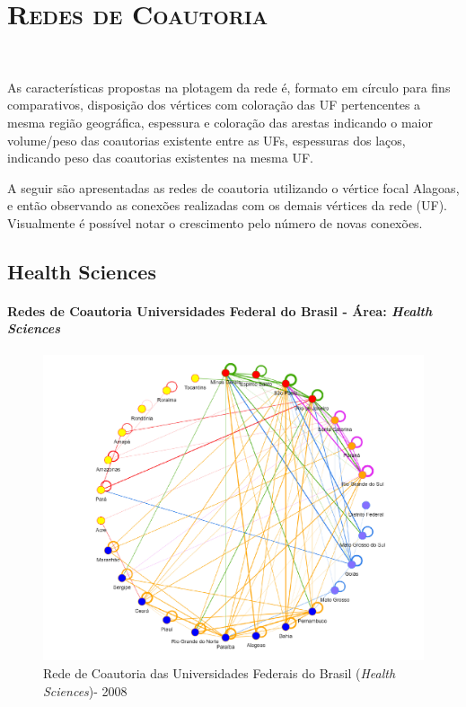 \chapter{\textsc{Redes de Coautoria}}~\label{redes}

As características propostas na plotagem da rede é, formato em círculo para fins comparativos, disposição dos vértices com coloração das UF pertencentes a mesma região geográfica, espessura e coloração das arestas indicando o maior volume/peso das coautorias existente entre as UFs, espessuras dos laços, indicando peso das coautorias existentes na mesma UF.

A seguir são apresentadas as redes de coautoria utilizando o vértice focal Alagoas, e então observando as conexões realizadas com os demais vértices da rede (UF). Visualmente é possível notar o crescimento pelo número de novas conexões.



\section{\textbf{Health Sciences}}

\subsubsection{Redes de Coautoria Universidades Federal do Brasil - Área: \textit{Health Sciences}}


\begin{figure}[H]
	\centering
	\includegraphics[width=\linewidth]{Imagens/rede-2008.pdf}
	\caption{Rede de Coautoria das Universidades Federais do Brasil (\textit{Health Sciences})- 2008}
	\label{Rede de Coautoria - UF BR 2008}
\end{figure}

